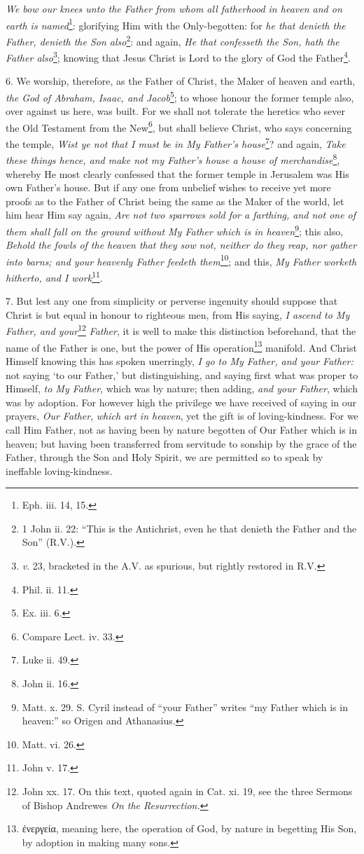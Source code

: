 \emph{We bow our knees unto the Father from whom all fatherhood in heaven and on earth is named}\footnote{Eph. iii. 14, 15.}: glorifying Him with the Only-begotten: for \emph{he that denieth the Father, denieth the Son also}\footnote{1 John ii. 22: “This is the Antichrist, even he that denieth the Father and the Son” (\textsc{R.V.}).}: and again, \emph{He that confesseth the Son, hath the Father also}\footnote{\emph{v}. 23, bracketed in the A.V. as spurious, but rightly restored in R.V.}; knowing that Jesus Christ is Lord to the glory of God the Father\footnote{Phil. ii. 11.}.

6. We worship, therefore, as the Father of Christ, the Maker of heaven and earth, \emph{the God of Abraham, Isaac, and Jacob}\footnote{Ex. iii. 6.}; to whose honour the former temple also, over against us here, was built. For we shall not tolerate the heretics who sever the Old Testament from the New\footnote{Compare Lect. iv. 33.}, but shall believe Christ, who says concerning the temple, \emph{Wist ye not that I must be in My Father’s house}\footnote{Luke ii. 49.}? and again, \emph{Take these things hence, and make not my Father’s house a house of merchandise}\footnote{John ii. 16.}, whereby He most clearly confessed that the former temple in Jerusalem was His own Father’s house. But if any one from unbelief wishes to receive yet more proofs as to the Father of Christ being the same as the Maker of the world, let him hear Him say again, \emph{Are not two sparrows sold for a farthing, and not one of them shall fall on the ground without My Father which is in heaven}\footnote{Matt. x. 29. S. Cyril instead of “your Father” writes “my Father which is in heaven:” so Origen and Athanasius.}; this also, \emph{Behold the fowls of the heaven that they sow not, neither do they reap, nor gather into barns; and your heavenly Father feedeth them}\footnote{Matt. vi. 26.}; and this, \emph{My Father worketh hitherto, and I work}\footnote{John v. 17.}.

7. But lest any one from simplicity or perverse ingenuity should suppose that Christ is but equal in honour to righteous men, from His saying, \emph{I ascend to My Father, and your}\footnote{John xx. 17. On this text, quoted again in Cat. xi. 19, see the three Sermons of Bishop Andrewes \emph{On the Resurrection.}} \emph{Father}, it is well to make this distinction beforehand, that the name of the Father is one, but the power of His operation\footnote{\textgreek{ἐνεργεία}, meaning here, the operation of God, by nature in begetting His Son, by adoption in making many sons.} manifold. And Christ Himself knowing this has spoken unerringly, \emph{I go to My Father, and your Father:} not saying ‘to our Father,’ but distinguishing, and saying first what was proper to Himself, \emph{to My Father}, which was by nature; then adding, \emph{and your Father}, which was by adoption. For however high the privilege we have received of saying in our prayers, \emph{Our Father}, \emph{which art in heaven}, yet the gift is of loving-kindness. For we call Him Father, not as having been by nature begotten of Our Father which is in heaven; but having been transferred from servitude to sonship by the grace of the Father, through the Son and Holy Spirit, we are permitted so to speak by ineffable loving-kindness.

